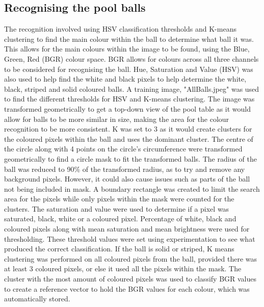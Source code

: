 \documentclass[12pt]{article}
\begin{document}
\subsection{Recognising the pool balls}
The recognition involved using HSV classification thresholds and K-means clustering to find the main colour within the ball to determine what ball it was. This allows for the main colours within the image to be found, using the Blue, Green, Red (BGR) colour space. 
BGR allows for colours across all three channels to be considered for recognising the ball. Hue, Saturation and Value (HSV) was also used to help find the white and black pixels to help determine the white, black, striped and solid coloured balls. 
A training image, "AllBalls.jpeg" was used to find the different thresholds for HSV and K-means clustering. The image was transformed geometrically to get a top-down view of the pool table as it would allow for balls to be more similar in size, making the area for the colour recognition to be more consistent. 
K was set to 3 as it would create clusters for the coloured pixels within the ball and uses the dominant cluster. The centre of the circle along with 4 points on the circle's circumference were transformed geometrically to find a circle mask to fit the transformed balls. 
The radius of the ball was reduced to 90\% of the transformed radius, as to try and remove any background pixels. 
However, it could also cause issues such as parts of the ball not being included in mask. 
A boundary rectangle was created to limit the search area for the pixels while only pixels within the mask were counted for the clusters. 
The saturation and value were used to determine if a pixel was saturated, black, white or a coloured pixel. 
Percentage of white, black and coloured pixels along with mean saturation and mean brightness were used for thresholding. 
These threshold values were set using experimentation to see what produced the correct classification. 
If the ball is solid or striped, K means clustering was performed on all coloured pixels from the ball, provided there was at least 3 coloured pixels, or else it used all the pixels within the mask. 
The cluster with the most amount of coloured pixels was used to classify BGR values to create a reference vector to hold the BGR values for each colour, which was automatically stored.
\end{document}
